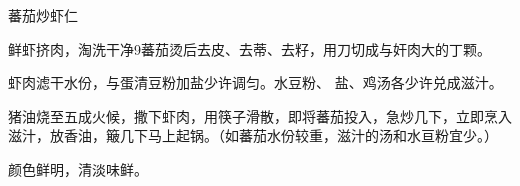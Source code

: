 \begin{recipe}{蕃茄炒虾仁}

\ingredients


\preparation

\step 鲜虾挤肉，淘洗干净9蕃茄烫后去皮、去蒂、去籽，用刀切成与奸肉大的丁颗。

\step 虾肉滤干水份，与蛋清豆粉加盐少许调匀。水豆粉、 盐、鸡汤各少许兑成滋汁。

\step 猪油烧至五成火候，撒下虾肉，用筷子滑散，即将蕃茄投入，急炒几下，立即烹入
滋汁，放香油，簸几下马上起锅。（如蕃茄水份较重，滋汁的汤和水亘粉宜少。）

\features

颜色鲜明，清淡味鲜。

\end{recipe}

